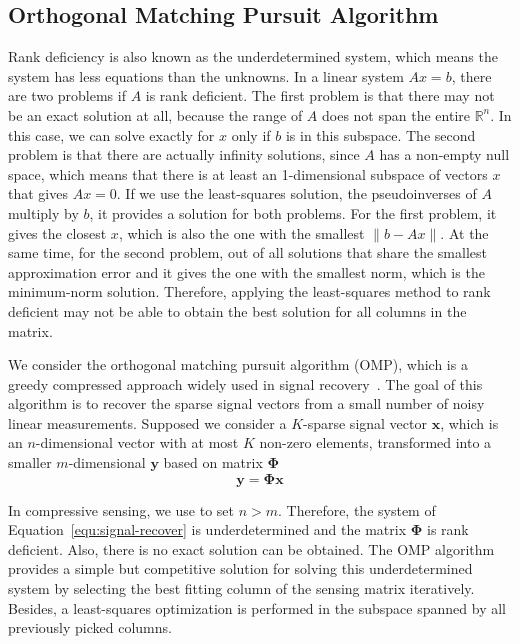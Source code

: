 \subsection{Orthogonal Matching Pursuit Algorithm}
Rank deficiency is also known as the underdetermined system, which means the system has less equations than the unknowns. In a linear system $Ax=b$, there are two problems if $A$ is rank deficient. The first problem is that there may not be an exact solution at all, because the range of $A$ does not span the entire $\mathbb{R}^n$. In this case, we can solve exactly for $x$ only if $b$ is in this subspace. The second problem is that there are actually infinity solutions, since $A$ has a non-empty null space, which means that there is at least an 1-dimensional subspace of vectors $x$ that gives $Ax=0$. If we use the least-squares solution, the pseudoinverses of $A$ multiply by $b$, it provides a solution for both problems. For the first problem, it gives the closest $x$, which is also the one with the smallest $\|b-Ax\|$. At the same time, for the second problem, out of all solutions that share the smallest approximation error and it gives the one with the smallest norm, which is the minimum-norm solution. Therefore, applying the least-squares method to rank deficient may not be able to obtain the best solution for all columns in the matrix. 
\par We consider the orthogonal matching pursuit algorithm (OMP), which is a greedy compressed approach widely used in signal recovery~\citep{MS:93}. The goal of this algorithm is to recover the sparse signal vectors from a small number of noisy linear measurements. Supposed we consider a $K$-sparse signal vector $\mathbf{x}$, which is an $n$-dimensional vector with at most $K$ non-zero elements, transformed into a smaller $m$-dimensional $\mathbf{y}$ based on matrix $\mathbf{\Phi}$
\begin{equation}
    \label{equ:signal-recover}
    \mathbf{y}=\mathbf{\Phi} \mathbf{x}
\end{equation}
\par In compressive sensing, we use to set $n > m$. Therefore, the system of Equation~\ref{equ:signal-recover} is underdetermined and the matrix $\mathbf{\Phi}$ is rank deficient. Also, there is no exact solution can be obtained. The OMP algorithm provides a simple but competitive solution for solving this underdetermined system by selecting the best fitting column of the sensing matrix iteratively. Besides, a least-squares optimization is performed in the subspace spanned by all previously picked columns. 
